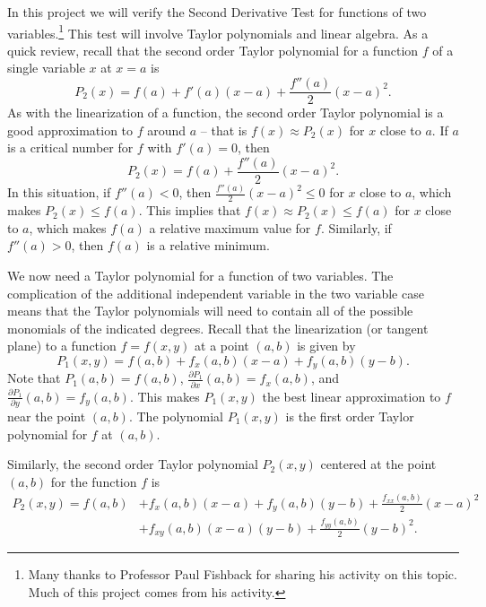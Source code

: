 	
\ee


In this project we will verify the Second Derivative Test for functions of two variables.\footnote{Many thanks to Professor Paul Fishback for sharing his activity on this topic. Much of this project comes from his activity.} This test will involve Taylor polynomials and linear algebra. As a quick review, recall that the second order Taylor polynomial for a function $f$ of a single variable $x$ at $x = a$ is 
\begin{equation} \label{eq:Taylor_2}
P_2(x) = f(a)+f'(a)(x-a)+\frac{f''(a)}{2}(x-a)^2. 
\end{equation}
As with the linearization of a function, the second order Taylor polynomial is a good approximation to $f$ around $a$ -- that is $f(x) \approx P_2(x)$ for $x$ close to $a$. If $a$ is a critical number for $f$ with $f'(a) = 0$, then 
\[P_2(x) = f(a) + \frac{f''(a)}{2}(x-a)^2.\]
In this situation, if $f''(a) < 0$, then $\frac{f''(a)}{2}(x-a)^2 \leq 0$ for $x$ close to $a$, which makes $P_2(x) \leq f(a)$. This implies that $f(x) \approx P_2(x) \leq  f(a)$ for $x$ close to $a$, which makes $f(a)$ a relative maximum value for $f$. Similarly, if $f''(a) > 0$, then $f(a)$ is a relative minimum.

We now need a Taylor polynomial for a function of two variables. The complication of the additional independent variable in the two variable case means that the Taylor polynomials will need to contain all of the possible monomials of the indicated degrees. Recall that the linearization (or tangent plane) to a function $f = f(x,y)$ at a point $(a,b)$ is given by 
\[P_1(x,y) = f(a,b) + f_x(a,b)(x-a) + f_y(a,b)(y-b).\]
Note that $P_1(a,b) = f(a,b)$, $\frac{\partial P_1}{\partial x}(a,b) = f_x(a,b)$, and $\frac{\partial P_1}{\partial y}(a,b) = f_y(a,b)$. This makes $P_1(x,y)$ the best linear approximation to $f$ near the point $(a,b)$. The polynomial $P_1(x,y)$ is the first order Taylor polynomial for $f$ at $(a,b)$. 

Similarly, the second order Taylor polynomial $P_2(x,y)$ centered at the point $(a,b)$ for the function $f$ is 
\begin{align*}
P_2(x,y) = f(a,b) &+ f_x(a,b)(x-a) + f_y(a,b)(y-b) + \frac{f_{xx}(a,b)}{2}(x-a)^2 \\
		          &+ f_{xy}(a,b)(x-a)(y-b) + \frac{f_{yy}(a,b)}{2}(y-b)^2.
\end{align*}		       


